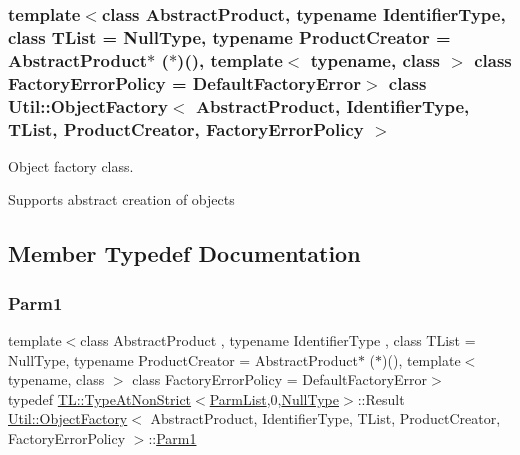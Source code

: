 \subsubsection*{template$<$class Abstract\+Product, typename Identifier\+Type, class T\+List = Null\+Type, typename Product\+Creator = Abstract\+Product$\ast$ ($\ast$)(), template$<$ typename, class $>$ class Factory\+Error\+Policy = Default\+Factory\+Error$>$\newline
class Util\+::\+Object\+Factory$<$ Abstract\+Product, Identifier\+Type, T\+List, Product\+Creator, Factory\+Error\+Policy $>$}

Object factory class. 

Supports abstract creation of objects 

\subsection{Member Typedef Documentation}
\mbox{\label{classUtil_1_1ObjectFactory_a47e4f863537be7a4f5f5972691bb0b57}} 
\subsubsection{\texorpdfstring{Parm1}{Parm1}\hspace{0.1cm}{\footnotesize\ttfamily [1/3]}}
{\footnotesize\ttfamily template$<$class Abstract\+Product , typename Identifier\+Type , class T\+List  = Null\+Type, typename Product\+Creator  = Abstract\+Product$\ast$ ($\ast$)(), template$<$ typename, class $>$ class Factory\+Error\+Policy = Default\+Factory\+Error$>$ \\
typedef \mbox{\hyperlink{structUtil_1_1TL_1_1TypeAtNonStrict}{T\+L\+::\+Type\+At\+Non\+Strict}}$<$\mbox{\hyperlink{classUtil_1_1ObjectFactory_a46f003a5928e8a60140e0a74ac261c36}{Parm\+List}},0,\mbox{\hyperlink{classUtil_1_1NullType}{Null\+Type}}$>$\+::Result \mbox{\hyperlink{classUtil_1_1ObjectFactory}{Util\+::\+Object\+Factory}}$<$ Abstract\+Product, Identifier\+Type, T\+List, Product\+Creator, Factory\+Error\+Policy $>$\+::\mbox{\hyperlink{classUtil_1_1ObjectFactory_a47e4f863537be7a4f5f5972691bb0b57}{Parm1}}}

